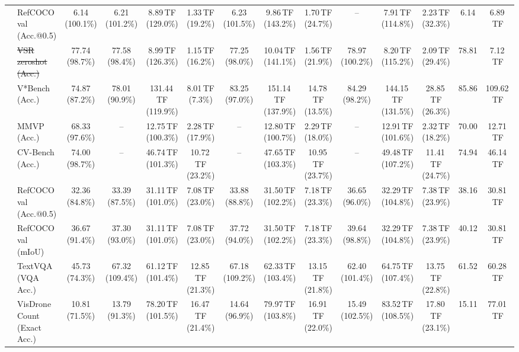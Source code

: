 \begin{table}[t]
\begin{center}
\begin{small}
\begin{sc}
{\begin{tabular}{llcccccccccccc}
& RefCOCO val (Acc.@0.5) & 6.14 (100.1\%) & 6.21 (101.2\%) & 8.89\,TF (129.0\%) & 1.33\,TF (19.2\%) & 6.23 (101.5\%) & 9.86\,TF (143.2\%) & 1.70\,TF (24.7\%) & -- & 7.91\,TF (114.8\%) & 2.23\,TF (32.3\%) & 6.14 & 6.89\,TF \\
& \sout{VSR zeroshot (Acc.)} & 77.74 (98.7\%) & 77.58 (98.4\%) & 8.99\,TF (126.3\%) & 1.15\,TF (16.2\%) & 77.25 (98.0\%) & 10.04\,TF (141.1\%) & 1.56\,TF (21.9\%) & 78.97 (100.2\%) & 8.20\,TF (115.2\%) & 2.09\,TF (29.4\%) & 78.81 & 7.12\,TF \\
& V*Bench (Acc.) & 74.87 (87.2\%) & 78.01 (90.9\%) & 131.44\,TF (119.9\%) & 8.01\,TF (7.3\%) & 83.25 (97.0\%) & 151.14\,TF (137.9\%) & 14.78\,TF (13.5\%) & 84.29 (98.2\%) & 144.15\,TF (131.5\%) & 28.85\,TF (26.3\%) & 85.86 & 109.62\,TF \\
\midrule
{}
& MMVP (Acc.) & 68.33 (97.6\%) & -- & 12.75\,TF (100.3\%) & 2.28\,TF (17.9\%) & -- & 12.80\,TF (100.7\%) & 2.29\,TF (18.0\%) & -- & 12.91\,TF (101.6\%) & 2.32\,TF (18.2\%) & 70.00 & 12.71\,TF \\
& CV-Bench (Acc.) & 74.00 (98.7\%) & -- & 46.74\,TF (101.3\%) & 10.72\,TF (23.2\%) & -- & 47.65\,TF (103.3\%) & 10.95\,TF (23.7\%) & -- & 49.48\,TF (107.2\%) & 11.41\,TF (24.7\%) & 74.94 & 46.14\,TF \\
& RefCOCO val (Acc.@0.5) & 32.36 (84.8\%) & 33.39 (87.5\%) & 31.11\,TF (101.0\%) & 7.08\,TF (23.0\%) & 33.88 (88.8\%) & 31.50\,TF (102.2\%) & 7.18\,TF (23.3\%) & 36.65 (96.0\%) & 32.29\,TF (104.8\%) & 7.38\,TF (23.9\%) & 38.16 & 30.81\,TF \\
& RefCOCO val (mIoU) & 36.67 (91.4\%) & 37.30 (93.0\%) & 31.11\,TF (101.0\%) & 7.08\,TF (23.0\%) & 37.72 (94.0\%) & 31.50\,TF (102.2\%) & 7.18\,TF (23.3\%) & 39.64 (98.8\%) & 32.29\,TF (104.8\%) & 7.38\,TF (23.9\%) & 40.12 & 30.81\,TF \\
& TextVQA (VQA Acc.) & 45.73 (74.3\%) & 67.32 (109.4\%) & 61.12\,TF (101.4\%) & 12.85\,TF (21.3\%) & 67.18 (109.2\%) & 62.33\,TF (103.4\%) & 13.15\,TF (21.8\%) & 62.40 (101.4\%) & 64.75\,TF (107.4\%) & 13.75\,TF (22.8\%) & 61.52 & 60.28\,TF \\
& VisDrone Count (Exact Acc.) & 10.81 (71.5\%) & 13.79 (91.3\%) & 78.20\,TF (101.5\%) & 16.47\,TF (21.4\%) & 14.64 (96.9\%) & 79.97\,TF (103.8\%) & 16.91\,TF (22.0\%) & 15.49 (102.5\%) & 83.52\,TF (108.5\%) & 17.80\,TF (23.1\%) & 15.11 & 77.01\,TF \\

\end{tabular}}
\end{sc}
\end{small}
\end{center}
\end{table}
